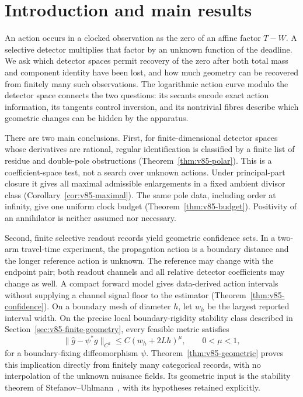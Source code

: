 \section{Introduction and main results}
\label{sec:v83-main}
An action occurs in a clocked observation as the zero of an affine
factor $T-W$. A selective detector multiplies that factor by an unknown
function of the deadline. We ask which detector spaces permit recovery
of the zero after both total mass and component identity have been lost,
and how much geometry can be recovered from finitely many such
observations. The logarithmic action curve modulo the detector space
connects the two questions: its secants encode exact action information,
its tangents control inversion, and its nontrivial fibres describe
which geometric changes can be hidden by the apparatus.

There are two main conclusions. First, for finite-dimensional detector
spaces whose derivatives are rational, regular identification is
classified by a finite list of residue and double-pole obstructions
(Theorem~\ref{thm:v85-polar}). This is a coefficient-space test, not a
search over unknown actions. Under principal-part closure it gives all
maximal admissible enlargements in a fixed ambient divisor class
(Corollary~\ref{cor:v85-maximal}). The same pole data, including order
at infinity, give one uniform clock budget
(Theorem~\ref{thm:v85-budget}). Positivity of an annihilator is neither
assumed nor necessary.

Second, finite selective readout records yield geometric confidence
sets. In a two-arm travel-time experiment, the propagation action is
a boundary distance and the longer reference action is unknown. The
reference may change with the endpoint pair; both readout channels and
all relative detector coefficients may change as well. A compact
forward model gives data-derived action intervals without supplying a
channel signal floor to the estimator
(Theorem~\ref{thm:v85-confidence}). On a boundary mesh of diameter $h$,
let $w_h$ be the largest reported interval width. On the precise local
boundary-rigidity stability class described in
Section~\ref{sec:v85-finite-geometry}, every feasible metric satisfies
\[
                 \|\widehat g-\psi^*g\|_{C^2}
                         \le C(w_h+2Lh)^\mu,
                     \qquad 0<\mu<1,
\]
for a boundary-fixing diffeomorphism $\psi$. Theorem~\ref{thm:v85-geometric}
proves this implication directly from finitely many categorical
records, with no interpolation of the unknown nuisance fields.
Its geometric input is the stability theorem of
Stefanov--Uhlmann~\cite{V85SU}, with its hypotheses retained explicitly.

